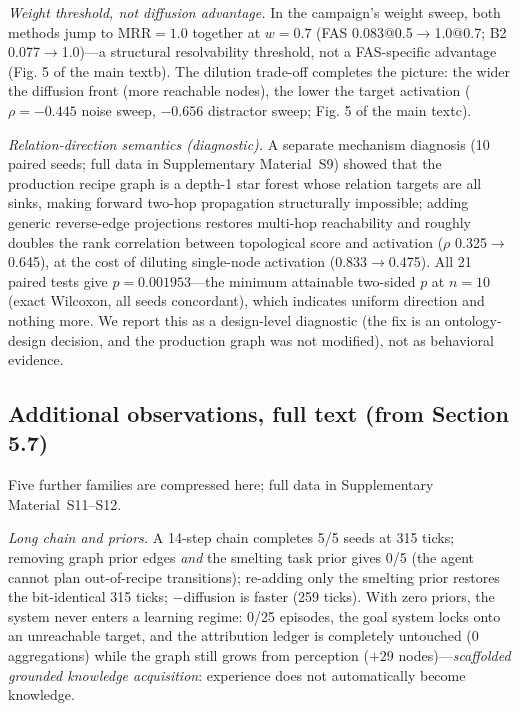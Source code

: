 \documentclass[10pt]{article}
\begin{document}
\emph{Weight threshold, not diffusion advantage.} In the campaign's weight sweep, both methods jump to MRR${=}1.0$ together at $w{=}0.7$ (FAS 0.083@0.5${\rightarrow}$1.0@0.7; B2 0.077${\rightarrow}$1.0)---a structural resolvability threshold, not a FAS-specific advantage (Fig. 5 of the main textb). The dilution trade-off completes the picture: the wider the diffusion front (more reachable nodes), the lower the target activation ($\rho{=}{-}0.445$ noise sweep, ${-}0.656$ distractor sweep; Fig. 5 of the main textc).


\emph{Relation-direction semantics (diagnostic).} A separate mechanism diagnosis (10 paired seeds; full data in Supplementary Material~S9) showed that the production recipe graph is a depth-1 star forest whose relation targets are all sinks, making forward two-hop propagation structurally impossible; adding generic reverse-edge projections restores multi-hop reachability and roughly doubles the rank correlation between topological score and activation ($\rho$ 0.325${\rightarrow}$0.645), at the cost of diluting single-node activation (0.833${\rightarrow}$0.475). All 21 paired tests give $p{=}0.001953$---the minimum attainable two-sided $p$ at $n{=}10$ (exact Wilcoxon, all seeds concordant), which indicates uniform direction and nothing more. We report this as a design-level diagnostic (the fix is an ontology-design decision, and the production graph was not modified), not as behavioral evidence.


\subsection{Additional observations, full text (from Section 5.7)}
Five further families are compressed here; full data in Supplementary Material~S11--S12.

\emph{Long chain and priors.} A 14-step chain completes 5/5 seeds at 315 ticks; removing graph prior edges \emph{and} the smelting task prior gives 0/5 (the agent cannot plan out-of-recipe transitions); re-adding only the smelting prior restores the bit-identical 315 ticks; $-$diffusion is faster (259 ticks). With zero priors, the system never enters a learning regime: 0/25 episodes, the goal system locks onto an unreachable target, and the attribution ledger is completely untouched (0 aggregations) while the graph still grows from perception ($+29$ nodes)---\emph{scaffolded grounded knowledge acquisition}: experience does not automatically become knowledge.
\end{document}
